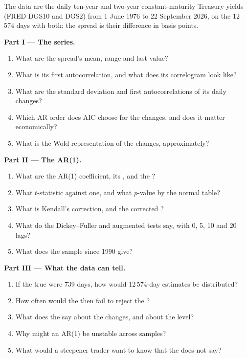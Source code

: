 \begin{problem}\label{pb:qm:linear-time-series:1}
The data are the daily ten-year and two-year constant-maturity Treasury yields (FRED DGS10 and DGS2) from 1 June 1976 to 22 September 2026, on the 12\,574
days with both; the spread is their difference in basis points.

\medskip\noindent\textbf{Part I --- The series.}
\begin{enumerate}
\item What are the spread's mean, range and last value?
\item What is its first autocorrelation, and what does its correlogram look like?
\item What are the standard deviation and first autocorrelations of its daily changes?
\item Which AR order does AIC choose for the changes, and does it matter economically?
\item What is the Wold representation of the changes, approximately?
\end{enumerate}

\medskip\noindent\textbf{Part II --- The AR(1).}
\begin{enumerate}[resume]
\item What are the AR(1) coefficient, its , and the ?
\item What $t$-statistic against one, and what $p$-value by the normal table?
\item What is Kendall's correction, and the corrected ?
\item What do the Dickey--Fuller and augmented tests say, with 0, 5, 10 and 20 lags?
\item What does the sample since 1990 give?
\end{enumerate}

\medskip\noindent\textbf{Part III --- What the data can tell.}
\begin{enumerate}[resume]
\item If the true  were 739 days, how would 12\,574-day estimates be distributed?
\item How often would the  then fail to reject the ?
\item What does the  say about the changes, and about the level?
\item Why might an AR(1)  be unstable across samples?
\item What would a steepener trader want to know that the  does not say?
\end{enumerate}


\end{problem}
